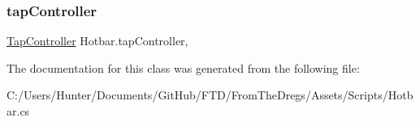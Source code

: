 \mbox{\label{class_hotbar_a0281562a5bf5e3224f4d88f090bf3a84}} 
\subsubsection{\texorpdfstring{tapController}{tapController}}
{\footnotesize\ttfamily \mbox{\hyperlink{class_tap_controller}{Tap\+Controller}} Hotbar.\+tap\+Controller\hspace{0.3cm}{\ttfamily [get]}, {\ttfamily [set]}}



The documentation for this class was generated from the following file\+:\begin{DoxyCompactItemize}
\item 
C\+:/\+Users/\+Hunter/\+Documents/\+Git\+Hub/\+F\+T\+D/\+From\+The\+Dregs/\+Assets/\+Scripts/Hotbar.\+cs\end{DoxyCompactItemize}
